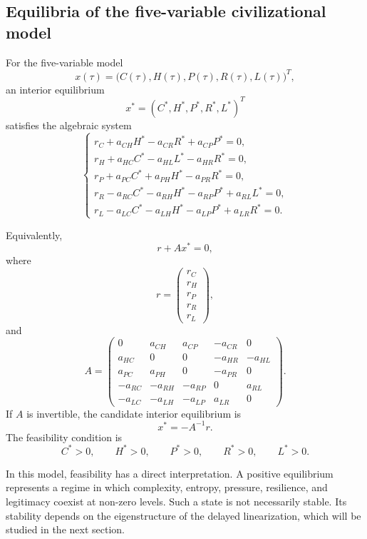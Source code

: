 \documentclass[11pt]{article}
\begin{document}
\subsection{Equilibria of the five-variable civilizational model}

For the five-variable model
\[
x(\tau)=
\big(C(\tau),H(\tau),P(\tau),R(\tau),L(\tau)\big)^{T},
\]
an interior equilibrium
\[
x^\ast=(C^\ast,H^\ast,P^\ast,R^\ast,L^\ast)^{T}
\]
satisfies the algebraic system
\begin{equation}
\label{eq:five-variable-equilibrium}
\begin{cases}
r_C+a_{CH}H^\ast-a_{CR}R^\ast+a_{CP}P^\ast=0,\\
r_H+a_{HC}C^\ast-a_{HL}L^\ast-a_{HR}R^\ast=0,\\
r_P+a_{PC}C^\ast+a_{PH}H^\ast-a_{PR}R^\ast=0,\\
r_R-a_{RC}C^\ast-a_{RH}H^\ast-a_{RP}P^\ast+a_{RL}L^\ast=0,\\
r_L-a_{LC}C^\ast-a_{LH}H^\ast-a_{LP}P^\ast+a_{LR}R^\ast=0.
\end{cases}
\end{equation}

Equivalently,
\[
r+Ax^\ast=0,
\]
where
\[
r=
\begin{pmatrix}
r_C\\ r_H\\ r_P\\ r_R\\ r_L
\end{pmatrix},
\]
and
\[
A=
\begin{pmatrix}
0 & a_{CH} & a_{CP} & -a_{CR} & 0\\
a_{HC} & 0 & 0 & -a_{HR} & -a_{HL}\\
a_{PC} & a_{PH} & 0 & -a_{PR} & 0\\
-a_{RC} & -a_{RH} & -a_{RP} & 0 & a_{RL}\\
-a_{LC} & -a_{LH} & -a_{LP} & a_{LR} & 0
\end{pmatrix}.
\]
If \(A\) is invertible, the candidate interior equilibrium is
\[
x^\ast=-A^{-1}r.
\]
The feasibility condition is
\[
C^\ast>0,\qquad H^\ast>0,\qquad P^\ast>0,\qquad R^\ast>0,\qquad L^\ast>0.
\]


	In this model, feasibility has a direct interpretation. A positive equilibrium
	represents a regime in which complexity, entropy, pressure, resilience, and
	legitimacy coexist at non-zero levels. Such a state is not necessarily stable.
	Its stability depends on the eigenstructure of the delayed linearization, which
	will be studied in the next section.
\end{document}
